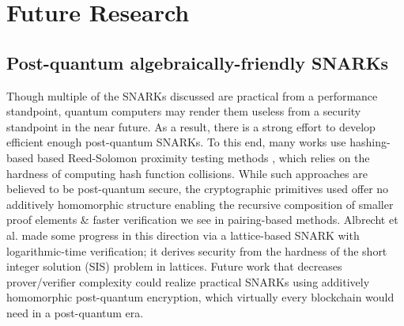 \section{Future Research}

\subsection{Post-quantum algebraically-friendly SNARKs}
\noindent Though multiple of the SNARKs discussed are practical from a performance standpoint, quantum computers may render them useless from a security standpoint in the near future. As a result, there is a strong effort to develop efficient enough post-quantum SNARKs. To this end, many works \cite{starks, ligero, fractal, spartan, jolt} use hashing-based based Reed-Solomon proximity testing methods \cite{fri}, which relies on the hardness of computing hash function collisions. While such approaches are believed to be post-quantum secure, the cryptographic primitives used offer no additively homomorphic structure enabling the recursive composition of smaller proof elements \& faster verification we see in pairing-based methods. Albrecht et al. \cite{lattice1} made some progress in this direction via a lattice-based SNARK with logarithmic-time verification; it derives security from the hardness of the short integer solution (SIS) problem in lattices. Future work that decreases prover/verifier complexity could realize practical SNARKs using additively homomorphic post-quantum encryption, which virtually every blockchain would need in a post-quantum era.

